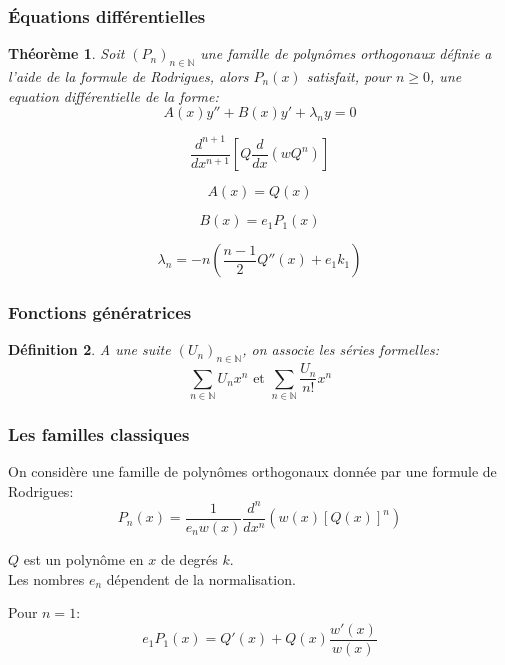 \documentclass[xcolor=dvipsnames,10pt,mathserif]{beamer}
\theoremstyle{plain}
\newtheorem{thm}{Th\'eor\`eme}%
\newtheorem{df}[thm]{D\'efinition}%
\begin{document}
\begin{frame}\frametitle{Équations différentielles \hfill \insertpagenumber}
\begin{thm}
Soit $(P_{n})_{n\in\mathbb{N}}$ une famille de polynômes orthogonaux définie a l'aide de la formule de Rodrigues, alors $P_{n}(x)$ satisfait, pour $n\geqslant0$, une equation différentielle de la forme: $$A(x)y''+B(x)y'+\lambda_{n}y=0$$
\end{thm}
\begin{equation}
\dfrac{d^{n+1}}{dx^{n+1}}[Q\dfrac{d}{dx}(wQ^n)]
\end{equation}

\begin{equation}
A(x)=Q(x)
\end{equation}

\begin{equation}
B(x)=e_{1}P_{1}(x)
\end{equation}

\begin{equation}
\lambda_{n}=-n \left(\dfrac{n-1}{2}Q''(x)+e_{1}k_{1}\right)
\end{equation}
\end{frame}


\begin{frame}\frametitle{Fonctions génératrices \hfill \insertpagenumber}
\begin{df}
A une suite $(U_n)_{n\in\mathbb{N}}$, on associe les séries formelles:
$$\sum_{n\in\mathbb{N}} U_n x^{n} \text{ et } \sum_{n\in\mathbb{N}}\dfrac{U_n}{n!} x^{n}$$
\end{df}
\end{frame}


\begin{frame}\frametitle{Les familles classiques \hfill \insertpagenumber}
\begin{block}{}
On considère une famille de polynômes orthogonaux donnée par une formule de Rodrigues: 
\begin{equation}
P_n(x)=\frac{1}{e_n w(x)} \frac{d^n}{dx^n}(w(x) [Q(x)]^n)
\end{equation}
\end{block}
$Q$ est un polynôme en $x$ de degrés $k$.
\\Les nombres $e_n$ dépendent de la normalisation.
\begin{block}{}
Pour $n=1$:
\begin{equation}
e_{1}P_{1}(x)= Q'(x)+Q(x)\dfrac{w'(x)}{w(x)}
\end{equation}
\end{block}
\end{frame}
\end{document}

